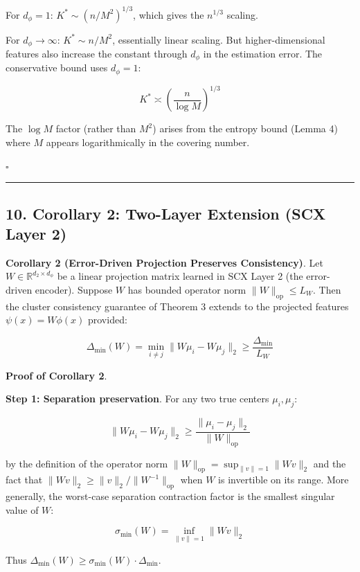 \documentclass[
  12pt,
]{article}
\begin{document}
For \(d_\phi = 1\): \(K^* \sim (n/M^2)^{1/3}\), which gives the
\(n^{1/3}\) scaling.

For \(d_\phi \to \infty\): \(K^* \sim n / M^2\), essentially linear
scaling. But higher-dimensional features also increase the constant
through \(d_\phi\) in the estimation error. The conservative bound uses
\(d_\phi = 1\):

\[K^* \asymp \left(\frac{n}{\log M}\right)^{1/3}\]

The \(\log M\) factor (rather than \(M^2\)) arises from the entropy
bound (Lemma 4) where \(M\) appears logarithmically in the covering
number.

\(\square\)

\begin{center}\rule{0.5\linewidth}{0.5pt}\end{center}

\subsection{10. Corollary 2: Two-Layer Extension (SCX Layer
2)}\label{corollary-2-two-layer-extension-scx-layer-2}

\textbf{Corollary 2 (Error-Driven Projection Preserves Consistency)}.
Let \(W \in \mathbb{R}^{d_2 \times d_\phi}\) be a linear projection
matrix learned in SCX Layer 2 (the error-driven encoder). Suppose \(W\)
has bounded operator norm \(\|W\|_{\text{op}} \leq L_W\). Then the
cluster consistency guarantee of Theorem 3 extends to the projected
features \(\psi(x) = W\phi(x)\) provided:

\[\Delta_{\min}(W) = \min_{i \neq j} \|W\mu_i - W\mu_j\|_2 \geq \frac{\Delta_{\min}}{L_W}\]

\textbf{Proof of Corollary 2}.

\textbf{Step 1: Separation preservation}. For any two true centers
\(\mu_i, \mu_j\):

\[\|W\mu_i - W\mu_j\|_2 \geq \frac{\|\mu_i - \mu_j\|_2}{\|W\|_{\text{op}}}\]

by the definition of the operator norm
\(\|W\|_{\text{op}} = \sup_{\|v\|=1} \|Wv\|_2\) and the fact that
\(\|Wv\|_2 \geq \|v\|_2 / \|W^{-1}\|_{\text{op}}\) when \(W\) is
invertible on its range. More generally, the worst-case separation
contraction factor is the smallest singular value of \(W\):

\[\sigma_{\min}(W) = \inf_{\|v\|=1} \|Wv\|_2\]

Thus \(\Delta_{\min}(W) \geq \sigma_{\min}(W) \cdot \Delta_{\min}\).
\end{document}
